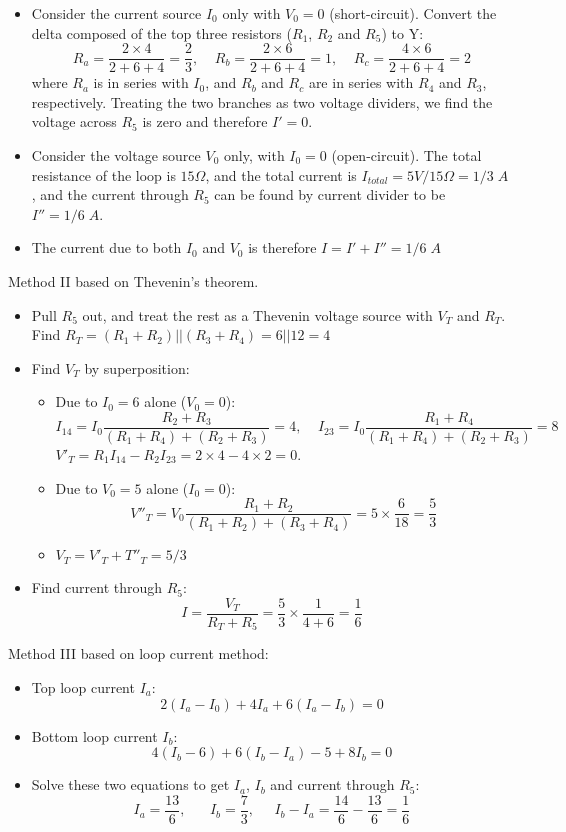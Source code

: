 \begin{enumerate}
\begin{itemize}
\item Consider the current source $I_0$ only with $V_0=0$ (short-circuit). 
  Convert the delta composed of the top three resistors ($R_1$, $R_2$ and 
  $R_5$) to Y:
  \[
  R_a=\frac{2\times 4}{2+6+4}=\frac{2}{3},\;\;\;\;
  R_b=\frac{2\times 6}{2+6+4}=1,\;\;\;\;R_c=\frac{4\times 6}{2+6+4}=2 
  \]
  where $R_a$ is in series with $I_0$, and $R_b$ and $R_c$ are in series 
  with $R_4$ and $R_3$, respectively. Treating the two branches as two 
  voltage dividers, we find the voltage across $R_5$ is zero and therefore 
  $I'=0$.
\item Consider the voltage source $V_0$ only, with $I_0=0$ (open-circuit).
  The total resistance of the loop is $15\Omega$, and the total current is 
  $I_{total}=5V/15\Omega=1/3\;A$, and the current through $R_5$ can be  found
  by current divider to be $I''=1/6\;A$. 
\item The current due to both $I_0$ and $V_0$ is therefore $I=I'+I''=1/6\;A$ 
\end{itemize}

Method II based on Thevenin's theorem. 
\begin{itemize}
\item Pull $R_5$ out, and treat the rest as a Thevenin voltage source
  with $V_T$ and $R_T$.
\itme Find $R_T=(R_1+R_2)||(R_3+R_4)=6||12=4$
\item Find $V_T$ by superposition:
  \begin{itemize}
  \item Due to $I_0=6$ alone ($V_0=0$): 
    \[ 
    I_{14}=I_0\frac{R_2+R_3}{(R_1+R_4)+(R_2+R_3)}=4,\;\;\;\;
    I_{23}=I_0\frac{R_1+R_4}{(R_1+R_4)+(R_2+R_3)}=8
    \]
    $V'_T=R_1I_{14}-R_2I_{23}=2\times 4-4\times 2=0$.
  \item Due to $V_0=5$ alone ($I_0=0$): 
    \[
    V''_T=V_0\frac{R_1+R_2}{(R_1+R_2)+(R_3+R_4)}=5\times \frac{6}{18}=\frac{5}{3}
    \]
  \item $V_T=V'_T+T''_T=5/3$
  \end{itemize}
\item Find current through $R_5$:
  \[
  I=\frac{V_T}{R_T+R_5}=\frac{5}{3}\times \frac{1}{4+6}=\frac{1}{6}
  \]
\end{itemize}

Method III based on loop current method:

\begin{itemize}
\item Top loop current $I_a$:
  \[   2(I_a-I_0)+4I_a+6(I_a-I_b)=0   \]
\item Bottom loop current $I_b$:
  \[   4(I_b-6)+6(I_b-I_a)-5+8I_b=0 \]
\item Solve these two equations to get $I_a$, $I_b$ and current
  through $R_5$:
  \[ I_a=\frac{13}{6},\;\;\;\;\;\;I_b=\frac{7}{3},\;\;\;\;\;
  I_b-I_a=\frac{14}{6}-\frac{13}{6}=\frac{1}{6} \]
\end{itemize}




\end{enumerate}
